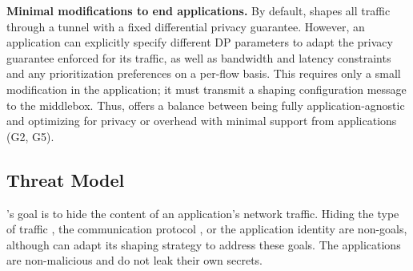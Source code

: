 \textbf{Minimal modifications to end applications.}
By default, {\sys} shapes all traffic through a tunnel with a fixed differential
privacy guarantee.
However, an application can explicitly specify different DP parameters to adapt
the privacy guarantee enforced for its traffic,
as well as bandwidth and latency constraints and any prioritization preferences
on a per-flow basis.
This requires only a small modification in the
application; it must transmit a shaping configuration message
to the middlebox.
Thus, {\sys} offers a balance between being fully
application-agnostic and optimizing for privacy or overhead with minimal
support from applications (G2, G5).

\subsection{Threat Model}
\label{subsec:threat-model}

{\sys}'s goal is to hide the content of an application's network traffic.
Hiding the type of traffic \cite{shapira2019flowpic}, the
communication protocol \cite{winter2013scramblesuit}, or the
application identity \cite{dyer2012peekaboo, danezis2009https} are
non-goals, although {\sys} can adapt its shaping strategy to address these goals.
The applications are non-malicious and do not leak their own secrets.

